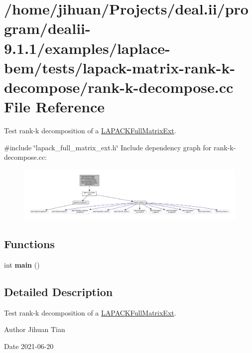 \hypertarget{rank-k-decompose_8cc}{}\section{/home/jihuan/\+Projects/deal.ii/program/dealii-\/9.1.1/examples/laplace-\/bem/tests/lapack-\/matrix-\/rank-\/k-\/decompose/rank-\/k-\/decompose.cc File Reference}
\label{rank-k-decompose_8cc}


Test rank-\/k decomposition of a \hyperlink{classLAPACKFullMatrixExt}{L\+A\+P\+A\+C\+K\+Full\+Matrix\+Ext}.  


{\ttfamily \#include \char`\"{}lapack\+\_\+full\+\_\+matrix\+\_\+ext.\+h\char`\"{}}\newline
Include dependency graph for rank-\/k-\/decompose.cc\+:\nopagebreak
\begin{figure}[H]
\begin{center}
\leavevmode
\includegraphics[width=350pt]{rank-k-decompose_8cc__incl}
\end{center}
\end{figure}
\subsection*{Functions}
\begin{DoxyCompactItemize}
\item 
\mbox{\label{rank-k-decompose_8cc_ae66f6b31b5ad750f1fe042a706a4e3d4}} 
int {\bfseries main} ()
\end{DoxyCompactItemize}


\subsection{Detailed Description}
Test rank-\/k decomposition of a \hyperlink{classLAPACKFullMatrixExt}{L\+A\+P\+A\+C\+K\+Full\+Matrix\+Ext}. 

\begin{DoxyAuthor}{Author}
Jihuan Tian 
\end{DoxyAuthor}
\begin{DoxyDate}{Date}
2021-\/06-\/20 
\end{DoxyDate}
